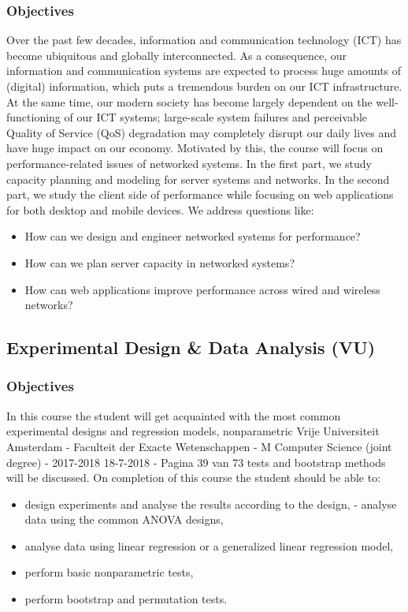 \documentclass[11pt]{article}
\begin{document}
\subsubsection{Objectives}
\label{sec:org9481032}

Over the past few decades, information and communication technology (ICT) has
become ubiquitous and globally interconnected. As a consequence, our information
and communication systems are expected to process huge amounts of (digital)
information, which puts a tremendous burden on our ICT infrastructure. At the
same time, our modern society has become largely dependent on the
well-functioning of our ICT systems; large-scale system failures and perceivable
Quality of Service (QoS) degradation may completely disrupt our daily lives and
have huge impact on our economy. Motivated by this, the course will focus on
performance-related issues of networked systems. In the first part, we study
capacity planning and modeling for server systems and networks. In the second
part, we study the client side of performance while focusing on web applications
for both desktop and mobile devices. We address questions like:
\begin{itemize}
\item How can we design and engineer networked systems for performance?
\item How can we plan server capacity in networked systems?
\item How can web applications improve performance across wired and wireless
networks?
\end{itemize}

\subsection{Experimental Design \& Data Analysis (VU)}
\label{sec:orga4635ce}

\subsubsection{Objectives}
\label{sec:org9e16856}

In this course the student will get acquainted with the most common experimental
designs and regression models, nonparametric Vrije Universiteit Amsterdam -
Faculteit der Exacte Wetenschappen - M Computer Science (joint degree) -
2017-2018 18-7-2018 - Pagina 39 van 73 tests and bootstrap methods will be
discussed. On completion of this course the student should be able to:
\begin{itemize}
\item design experiments and analyse the results according to the design, - analyse
data using the common ANOVA designs,
\item analyse data using linear regression or a generalized linear regression model,
\item perform basic nonparametric tests,
\item perform bootstrap and permutation tests.
\end{itemize}
\end{document}
